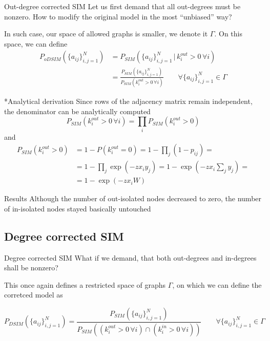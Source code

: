 \documentclass{beamer}
\begin{document}
\begin{frame}{Out-degree corrected SIM}
  Let us first demand that all out-degrees must be nonzero. How to modify the original model in the most ``unbiased'' way?
  
  In such case, our space of allowed graphs is smaller, we denote it $\Gamma$. On this space, we can define
\small
  \begin{align*}
    P_{oDSIM}\left(\{a_{ij}\}_{i,j=1}^N\right) &= P_{SIM}\left(\{a_{ij}\}_{i,j=1}^N \,|\, k_i^{out} > 0 \, \forall i\right)\\ &=\frac{P_{SIM}\left(\{a_{ij}\}_{i,j=1}^N\right)}{P_{SIM}\left(k_i^{out} > 0 \, \forall i\right)} \qquad \forall \{a_{ij}\}_{i,j=1}^N \in \Gamma
\end{align*}
\normalsize
  
\end{frame}

\begin{frame}{*Analytical derivation}
  Since rows of the adjacency matrix remain independent, the denominator can be analytically computed
  \begin{equation*}
      P_{SIM}\left(k_i^{out} > 0 \, \forall i\right) = \prod_i P_{SIM}\left(k_i^{out} > 0\right)
  \end{equation*}
 and 
 \begin{align*}
    P_{SIM}(k_i^{out} > 0) &= 1-P(k_i^{out}=0) = 1 - \prod_j(1-p_{ij}) = \\ &=1 - \prod_j\exp(-zx_i y_j) 
    = 1 - \exp(-zx_i\sum_j y_j) = \\ &= 1 - \exp(-zx_i W)
\end{align*}
  
\end{frame}

\begin{frame}{Results}
    Although the number of out-isolated nodes decreased to zero, the number of in-isolated nodes stayed basically untouched
\end{frame}

\subsection{Degree corrected SIM}
\begin{frame}{Degree corrected SIM}
  What if we demand, that both out-degrees and in-degrees shall be nonzero?

  This once again defines a restricted space of graphs $\Gamma$, on which we can define the corretced model as

\footnotesize
  \begin{equation*}
    P_{DSIM}\left(\{a_{ij}\}_{i,j=1}^N\right) = \frac{P_{SIM}\left(\{a_{ij}\}_{i,j=1}^N\right)}{P_{SIM}\left((k_i^{out} > 0 \, \forall i) \cap (k_i^{in} > 0 \, \forall i )\right)} \qquad \forall \{a_{ij}\}_{i,j=1}^N \in \Gamma
\end{equation*}
  
\normalsize
  
\end{frame}
\end{document}
